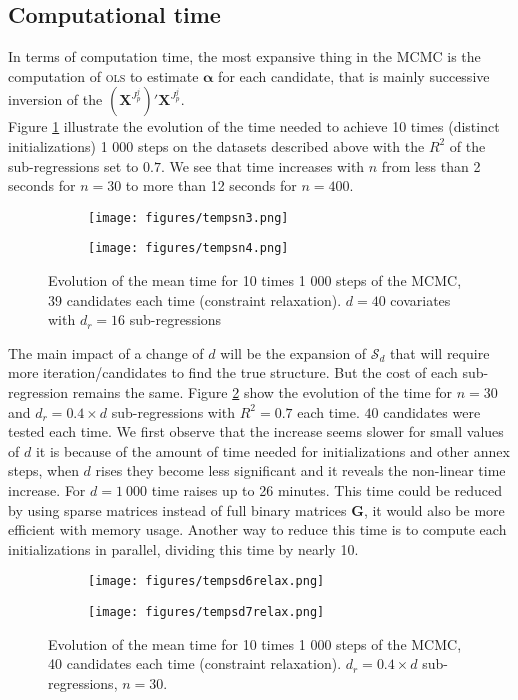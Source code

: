 \documentclass[12pt,a4paper]{report}
\begin{document}
\subsection{Computational time}
	In terms of computation time, the most expansive thing in the MCMC is the computation of \textsc{ols} to estimate $\boldsymbol{\alpha}$ for each candidate, that is mainly successive inversion of the $(\boldsymbol{X}^{J_p^j})'\boldsymbol{X}^{J_p^j}$. \\
	Figure \ref{tempsn} illustrate the evolution of the time needed to achieve 10 times (distinct initializations) 1 000 steps on the datasets described above with the $R^2$ of the sub-regressions set to $0.7$. We see that time increases with $n$ from less than 2 seconds for $n=30$ to more than 12 seconds for $n=400$.\\	
\begin{figure}[h]
\centering
	\begin{subfigure}
	\centering
		\texttt{[image: figures/tempsn3.png]} 
	\end{subfigure}
	\begin{subfigure}
	\centering
		\texttt{[image: figures/tempsn4.png]} 
	\end{subfigure}
	\caption{Evolution of the mean time for 10 times 1 000 steps of the MCMC, 39 candidates each time (constraint relaxation). $d=40$ covariates with $d_r=16$ sub-regressions}\label{tempsn}
\end{figure}
The main impact of a change of $d$ will be the expansion of $\mathcal{S}_d$ that will require more iteration/candidates to find the true structure. But the cost of each sub-regression remains the same. Figure \ref{tempsdrelax} show the evolution of the time for $n=30$ and $d_r=0.4\times d$ sub-regressions with $R^2=0.7$ each time. $40$ candidates were tested each time.
We first observe that the increase seems slower for small values of $d$ it is because of the amount of time needed for initializations and other annex steps, when $d$ rises they become less significant and it reveals the non-linear time increase. 
For $d=1\ 000$ time raises up to 26 minutes. This time could be reduced by using sparse matrices instead of full binary matrices $\boldsymbol{G}$, it would also be more efficient with memory usage. Another way to reduce this time is to compute each initializations in parallel, dividing this time by nearly 10.
 \\
\begin{figure}[h]
\centering
	\begin{subfigure}
	\centering
		\texttt{[image: figures/tempsd6relax.png]} 
	\end{subfigure}
	\begin{subfigure}
	\centering
		\texttt{[image: figures/tempsd7relax.png]} 
	\end{subfigure}
	\caption{Evolution of the mean time for 10 times 1 000 steps of the MCMC, 40 candidates each time (constraint relaxation). $d_r=0.4\times d$ sub-regressions, $n=30$.}\label{tempsdrelax}
\end{figure}
 
\end{document}
